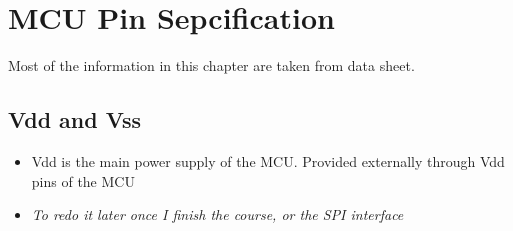 


\chapter{MCU Pin Sepcification}

Most of the information in this chapter are taken from data sheet.

\section{Vdd and Vss}

\begin{itemize}

\item Vdd is the main power supply of the MCU. Provided externally through Vdd pins of the MCU

\end{itemize}

 

\begin{itemize}

\item \textit{To redo it later once I finish the course, or the SPI interface}

\end{itemize}